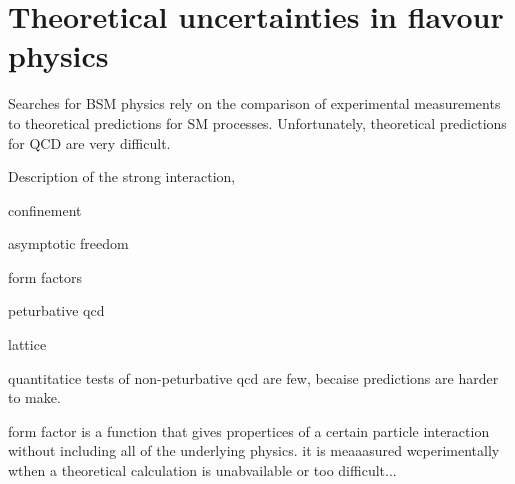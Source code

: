 \section{Theoretical uncertainties in flavour physics}

Searches for BSM physics rely on the comparison of experimental measurements to theoretical
predictions for SM processes.
Unfortunately, theoretical predictions for QCD are very difficult.


Description of the strong interaction,

confinement

asymptotic freedom

form factors

peturbative qcd

lattice

quantitatice tests of non-peturbative qcd are few, becaise predictions are harder to make.

form factor is a function that gives propertices of a certain particle interaction without
including all of the underlying physics.
it is meaaasured wcperimentally wthen a theoretical calculation is unabvailable or too difficult...
